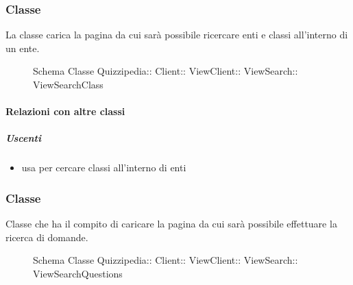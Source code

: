 \subsubsection{Classe }
La classe carica la pagina da cui sarà possibile ricercare enti e classi all'interno di un ente.
\begin{figure}[H]
\centering
\noindent{}
\caption[Schema Classe ViewSearchClass]{Schema Classe Quizzipedia:: Client:: ViewClient:: ViewSearch:: ViewSearchClass}
\end{figure}
\paragraph{Relazioni con altre classi}
\subparagraph{Uscenti}
\begin{itemize}
\item usa  per cercare classi all'interno di enti
\end{itemize}
\subsubsection{Classe }
Classe che ha il compito di caricare la pagina da cui sarà possibile effettuare la ricerca di domande.
\begin{figure}[H]
\centering
\noindent{}
\caption[Schema Classe ViewSearchQuestions]{Schema Classe Quizzipedia:: Client:: ViewClient:: ViewSearch:: ViewSearchQuestions}
\end{figure}

